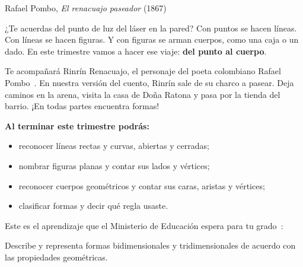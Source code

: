 \documentclass[11pt]{article}
\begin{document}
\encabezado

{Rafael Pombo, \emph{El renacuajo paseador} (1867)}


¿Te acuerdas del punto de luz del láser en la pared? Con puntos se hacen
líneas. Con líneas se hacen figuras. Y con figuras se arman cuerpos, como
una caja o un dado. En este trimestre vamos a hacer ese viaje:
\textbf{del punto al cuerpo}.

Te acompañará Rinrín Renacuajo, el personaje del poeta colombiano Rafael
Pombo~\cite{pombo}. En nuestra versión del cuento, Rinrín sale de su charco
a pasear. Deja caminos en la arena, visita la casa de Doña Ratona y pasa por
la tienda del barrio. ¡En todas partes encuentra formas!

\textbf{Al terminar este trimestre podrás:}
\begin{itemize}
  \item reconocer líneas rectas y curvas, abiertas y cerradas;
  \item nombrar figuras planas y contar sus lados y vértices;
  \item reconocer cuerpos geométricos y contar sus caras, aristas y vértices;
  \item clasificar formas y decir qué regla usaste.
\end{itemize}

Este es el aprendizaje que el Ministerio de Educación espera para tu
grado~\cite{mendba}:

\begin{dba}
Describe y representa formas bidimensionales y tridimensionales de acuerdo
con las propiedades geométricas.
\end{dba}

\end{document}

